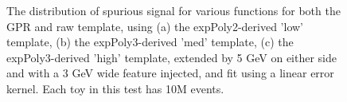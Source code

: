 \begin{figure} 
\begin{center}

\caption{The distribution of spurious signal for various functions for both the GPR and raw template, using (a) the expPoly2-derived 'low' template, (b) the expPoly3-derived 'med' template, (c) the expPoly3-derived 'high' template, extended by 5 GeV on either side and with a 3 GeV wide feature injected, and fit using a linear error kernel. Each toy in this test has 10M events.}
\label{fig:linearkernel_lowpt_10M_Sig}
\end{center}
\end{figure}

